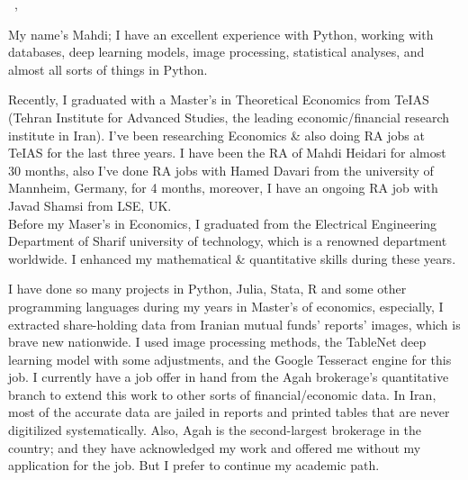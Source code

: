 \documentclass[12pt]{letter}
\begin{document}
\AddToShipoutPictureBG{%
    \color{gr}
    \AtPageUpperLeft{\rule[-1.3in]{\paperwidth}{1.3in}}
}

\begin{center}
    {\fontsize{28}{0}\selectfont\scshape \myname}

    \href{mailto:\myemail}{\faEnvelope\enspace \myemail}\hfill
    \href{tel:\myphone}{\faPhone\enspace \myphone}\hfill
    \faMapMarker \enspace \mylocation
\end{center}

\vspace{0.3in}



\vspace{-0.1in}

\greeting\
\recipient,\\

\vspace{-0.1in}\setlength\parindent{24pt}

My name's Mahdi; I have an excellent experience with Python, working with
databases, deep learning models, image processing, statistical analyses,
and almost all sorts of things in Python.

\par

Recently, I graduated with a Master's in Theoretical Economics from TeIAS (Tehran
Institute for Advanced Studies, the leading economic/financial research institute
in Iran). I've been researching Economics \&
also doing RA jobs at TeIAS for the last three years. I have been the RA of Mahdi Heidari for almost 30 months, also I've done RA jobs
with Hamed Davari from the university of Mannheim, Germany, for 4 months, moreover, I have an ongoing RA job with Javad Shamsi from LSE, UK.
\\
Before my Maser's in Economics, I graduated from the Electrical Engineering Department
of Sharif university of technology, which is a renowned department worldwide.
I enhanced my mathematical \& quantitative skills during these years.

\par

I have done so many projects in Python, Julia, Stata, R and some other programming
languages during my years in Master's of economics, especially, I extracted
share-holding data from Iranian mutual funds’ reports’ images, which is
brave new nationwide.
I used image processing methods, the TableNet deep learning model with some adjustments,
and the Google Tesseract engine for this job.
I currently have a job offer in hand from the Agah brokerage's quantitative branch
to extend this work to other sorts of financial/economic data. In Iran, most of
the accurate data are jailed in reports and printed tables that are never
digitilized systematically. Also, Agah is the second-largest brokerage in the
country; and they have acknowledged my work and offered me without my application
for the job. But I prefer to continue my academic path.
\end{document}
